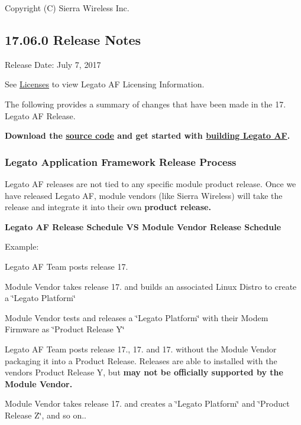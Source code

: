 Copyright (C) Sierra Wireless Inc. \hypertarget{releaseNotes17060}{}\subsection{17.06.0 Release Notes}\label{releaseNotes17060}
Release Date\+: July 7, 2017

See \hyperlink{aboutLicenses}{Licenses} to view Legato AF Licensing Information.

The following provides a summary of changes that have been made in the 17. Legato AF Release.

{\bfseries  Download the \hyperlink{aboutReleaseInfo}{source code} and get started with \hyperlink{basicBuild}{building Legato AF}. }\hypertarget{releaseNotes17060_rn_17_06_ReleaseNotes}{}\subsubsection{Legato Application Framework Release Process}\label{releaseNotes17060_rn_17_06_ReleaseNotes}
Legato AF releases are not tied to any specific module product release. Once we have released Legato AF, module vendors (like Sierra Wireless) will take the release and integrate it into their own {\bfseries  product release. }

{\bfseries  Legato AF Release Schedule VS Module Vendor Release Schedule }



Example\+:
\begin{DoxyItemize}
\item Legato AF Team posts release 17.
\item Module Vendor takes release 17. and builds an associated Linux Distro to create a \char`\"{}\+Legato
   Platform\char`\"{}
\item Module Vendor tests and releases a \char`\"{}\+Legato Platform\char`\"{} with their Modem Firmware as \char`\"{}\+Product
   Release Y\char`\"{}
\item Legato AF Team posts release 17., 17. and 17. without the Module Vendor packaging it into a Product Release. Releases are able to installed with the vendor\textquotesingle{}s Product Release Y, but {\bfseries  may not be officially supported by the Module Vendor. }
\item Module Vendor takes release 17. and creates a \char`\"{}\+Legato Platform\char`\"{} and \char`\"{}\+Product Release Z\char`\"{}, and so on..
\end{DoxyItemize}

